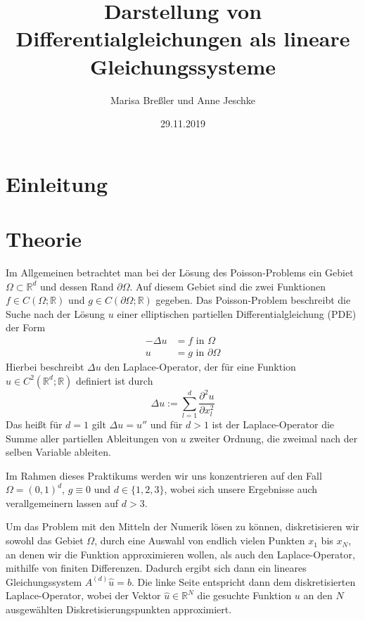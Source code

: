 \documentclass{scrartcl}
\newcommand{\R}{\mathbb{R}}
\begin{document}
\title{Darstellung von Differentialgleichungen als lineare Gleichungssysteme}
\author{Marisa Breßler und Anne Jeschke}
\date{29.11.2019}
\maketitle

\tableofcontents

\pagebreak
\section{Einleitung}

\pagebreak
\section{Theorie}
Im Allgemeinen betrachtet man bei der Lösung des Poisson-Problems ein Gebiet $\Omega\subset\R^d$ und dessen Rand $\partial\Omega$.
Auf diesem Gebiet sind die zwei Funktionen $f\in C(\Omega ; \R)$ und $g\in C(\partial\Omega ; \R)$ gegeben.
Das Poisson-Problem beschreibt die Suche nach der Lösung $u$ einer elliptischen partiellen Differentialgleichung (PDE) der Form
\[\begin{split}
-\Delta u &= f \textrm{ in } \Omega\\
        u &= g \textrm{ in } \partial\Omega
\end{split}
\]
Hierbei beschreibt $\Delta u$ den Laplace-Operator, der für eine Funktion $u\in C^2(\R^d;\R)$ definiert ist durch \[\Delta u := \sum_{l=1}^{d} \frac{\partial^2 u}{\partial x^2_l}\]
Das heißt für $d=1$ gilt $\Delta u = u''$ und für $d>1$ ist der Laplace-Operator die Summe aller partiellen Ableitungen von $u$ zweiter Ordnung, die zweimal nach der selben Variable ableiten.

Im Rahmen dieses Praktikums werden wir uns konzentrieren auf den Fall $\Omega=(0,1)^d$, $g\equiv0$ und $d\in\{1, 2, 3\}$, wobei sich unsere Ergebnisse auch verallgemeinern lassen auf $d>3$.

Um das Problem mit den Mitteln der Numerik lösen zu können, diskretisieren wir sowohl das Gebiet $\Omega$, durch eine Auswahl von endlich vielen Punkten $x_1$ bis $x_N$, an denen wir die Funktion approximieren wollen, als auch den Laplace-Operator, mithilfe von finiten Differenzen. Dadurch ergibt sich dann ein lineares Gleichungssystem $A^{(d)}\hat{u}=b$. Die linke Seite entspricht dann dem diskretisierten Laplace-Operator, wobei der Vektor $\hat{u}\in\R^N$ die gesuchte Funktion $u$ an den $N$ ausgewählten Diskretisierungspunkten approximiert.
\end{document}
